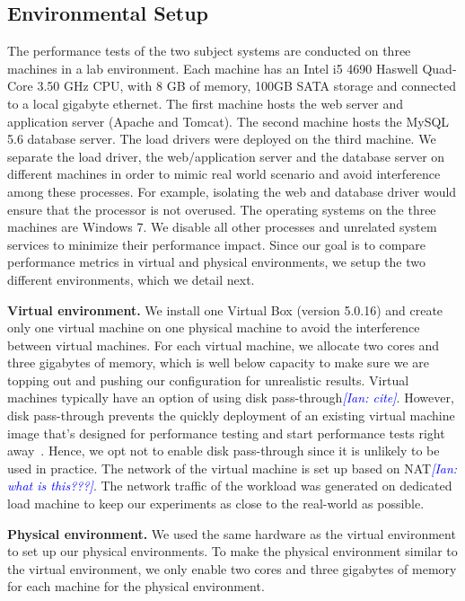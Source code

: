 \documentclass[smallextended]{svjour3}       %
\newcommand{\ian}[1]{\textcolor{blue}{{\it [Ian: #1]}}}
\begin{document}
\subsection{Environmental Setup}

The performance tests of the two subject systems are conducted on three machines in a lab environment. Each machine has an Intel i5 4690 Haswell Quad-Core 3.50 GHz CPU, with 8 GB of memory, 100GB SATA storage and connected to a local gigabyte ethernet. The first machine hosts the web server and application server (Apache and Tomcat). The second machine hosts the MySQL 5.6 database server. The load drivers were deployed on the third machine. We separate the load driver, the web/application server and the database server on different machines in order to mimic real world scenario and avoid interference among these processes. For example, isolating the web and database driver would ensure that the processor is not overused. The operating systems on the three machines are Windows 7. We disable all other processes and unrelated system services to minimize their performance impact. Since our goal is to compare performance metrics in virtual and physical environments, we setup the two different environments, which we detail next.


\noindent \textbf{Virtual environment.} We install one Virtual Box (version 5.0.16) and create only one virtual machine on one physical machine to avoid the interference between virtual machines. For each virtual machine, we allocate two cores and three gigabytes of memory, which is well below capacity to make sure we are topping out and pushing our configuration for unrealistic results. Virtual machines typically have an option of using disk pass-through\ian{cite}. However, disk pass-through prevents the quickly deployment of an existing virtual machine image that’s designed for performance testing and start performance tests right away~\cite{diskpassthrough}. Hence, we opt not to enable disk pass-through since it is unlikely to be used in practice. The network of the virtual machine is set up based on NAT\ian{what is this???}. The network traffic of the workload was generated on dedicated load machine to keep our experiments as close to the real-world as possible.


\noindent \textbf{Physical environment.} We used the same hardware as the virtual environment to set up our physical environments. To make the physical environment similar to the virtual environment, we only enable two cores and three gigabytes of memory for each machine for the physical environment. 
\end{document}
